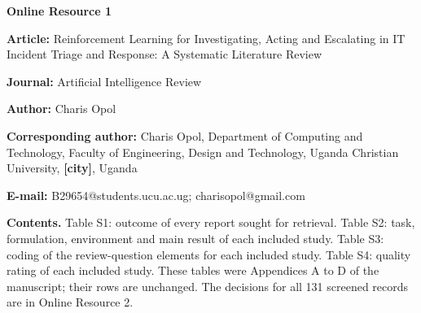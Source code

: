 \documentclass[10pt]{article}
\begin{document}
{\large\textbf{Online Resource 1}}\par\medskip
\textbf{Article:} Reinforcement Learning for Investigating, Acting and Escalating in IT Incident Triage and Response: A Systematic Literature Review\par
\textbf{Journal:} Artificial Intelligence Review\par
\textbf{Author:} Charis Opol\par
\textbf{Corresponding author:} Charis Opol, Department of Computing and Technology, Faculty of Engineering, Design and Technology, Uganda Christian University, \textbf{[city]}, Uganda\par
\textbf{E-mail:} B29654@students.ucu.ac.ug; charisopol@gmail.com\par\medskip
\textbf{Contents.} Table S1: outcome of every report sought for retrieval. Table S2: task, formulation, environment and main result of each included study. Table S3: coding of the review-question elements for each included study. Table S4: quality rating of each included study. These tables were Appendices A to D of the manuscript; their rows are unchanged. The decisions for all 131 screened records are in Online Resource 2.
\bigskip
\end{document}
